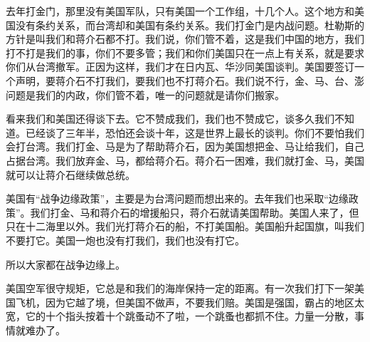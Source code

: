 去年打金门，那里没有美国军队，只有美国一个工作组，十几个人。这个地方和美国没有条约关系，而台湾却和美国有条约关系。我们打金门是内战问题。杜勒斯的方针是叫我们和蒋介石都不打。我们说，你们管不着，这是我们中国的地方，我们打不打是我们的事，你们不要多管；我们和你们美国只在一点上有关系，就是要求你们从台湾撤军。正因为这样，我们才在日内瓦、华沙同美国谈判。美国要签订一个声明，要蒋介石不打我们，要我们也不打蒋介石。我们说不行，金、马、台、澎问题是我们的内政，你们管不着，唯一的问题就是请你们搬家。

看来我们和美国还得谈下去。它不赞成我们，我们也不赞成它，谈多久我们不知道。已经谈了三年半，恐怕还会谈十年，这是世界上最长的谈判。你们不要怕我们会打台湾。我们打金、马是为了帮助蒋介石，因为美国想把金、马让给我们，自己占据台湾。我们放弃金、马，都给蒋介石。蒋介石一困难，我们就打金、马，美国就可以让蒋介石继续做总统。

美国有“战争边缘政策”，主要是为台湾问题而想出来的。去年我们也采取“边缘政策”。我们打金、马和蒋介石的增援船只，蒋介石就请美国帮助。美国人来了，但只在十二海里以外。我们光打蒋介石的船，不打美国船。美国船升起国旗，叫我们不要打它。美国一炮也没有打我们，我们也没有打它。

所以大家都在战争边缘上。

美国空军很守规矩，它总是和我们的海岸保持一定的距离。有一次我们打下一架美国飞机，因为它越了境，但美国不做声，不要我们赔。美国是强国，霸占的地区太宽，它的十个指头按着十个跳蚤动不了啦，一个跳蚤也都抓不住。力量一分散，事情就难办了。

